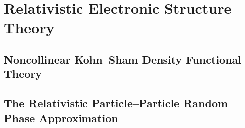 \chapter{Relativistic Electronic Structure Theory}

\section{Noncollinear Kohn--Sham Density Functional Theory}
\section{The Relativistic Particle--Particle Random Phase Approximation}
